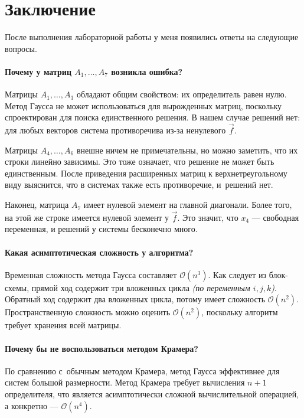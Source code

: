 \section{Заключение}

После выполнения лабораторной работы у меня появились ответы на следующие вопросы.

\paragraph{Почему у матриц $A_1,\ldots,A_7$ возникла ошибка?} Матрицы \( A_1,\ldots,A_3 \) обладают общим свойством: их определитель равен нулю. Метод Гаусса не может использоваться для вырожденных матриц, поскольку спроектирован для поиска единственного решения. В нашем случае решений нет: для любых векторов система противоречива из-за ненулевого \( \vec{f} \).

Матрицы \( A_4,\ldots,A_6 \) внешне ничем не примечательны, но можно заметить, что их строки линейно зависимы. Это тоже означает, что решение не может быть единственным. После приведения расширенных матриц к верхнетреугольному виду выяснится, что в системах также есть противоречие, и~решений нет.

Наконец, матрица \( A_7 \) имеет нулевой элемент на главной диагонали. Более того, на этой же строке имеется нулевой элемент у \( \vec{f} \). Это значит, что \( x_4 \) --- свободная переменная, и решений у системы бесконечно много.  

\paragraph{Какая асимптотическая сложность у алгоритма?}

Временная сложность метода Гаусса составляет $\mathcal{O}(n^3)$. Как следует из блок-схемы, прямой ход содержит три вложенных цикла \textit{(по переменным $i, j, k$)}. Обратный ход содержит два вложенных цикла, потому имеет сложность $\mathcal{O}(n^2)$. Пространственную сложность можно оценить \( \mathcal{O}(n^2) \), поскольку алгоритм требует хранения всей матрицы.

\paragraph{Почему бы не воспользоваться методом Крамера?} По сравнению с~обычным методом Крамера, метод Гаусса эффективнее для систем большой размерности. Метод Крамера требует вычисления $n+1$ определителя, что является асимптотически сложной вычислительной операцией, а конкретно --- \( \mathcal{O}(n^4) \).

